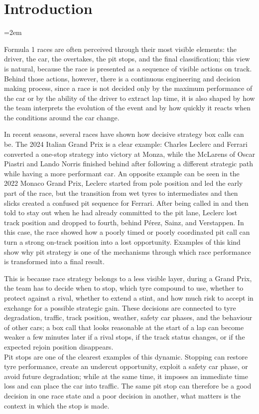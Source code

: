 \chapter{Introduction}
\label{ch:introduction}
\emergencystretch=2em

Formula 1 races are often perceived through their most visible elements: the driver, the car, the overtakes, the pit stops, and the final classification; this view is natural,
because the race is presented as a sequence of visible actions on track. Behind those actions, however, there is a continuous engineering and decision making process, since
a race is not decided only by the maximum performance of the car or by the ability of the driver to extract lap time, it is also shaped by how the team interprets the
evolution of the event and by how quickly it reacts when the conditions around the car change.

In recent seasons, several races have shown how decisive strategy box calls can be. The 2024 Italian Grand Prix is a clear example: Charles Leclerc and Ferrari converted a 
one-stop strategy into victory at Monza, while the McLarens of Oscar Piastri and Lando Norris finished behind after following a different strategic path while having a more performant car.
An opposite example can be seen in the 2022 Monaco Grand Prix, Leclerc started from pole position and led the early part of the race, but the transition 
from wet tyres to intermediates and then slicks created a confused pit sequence for Ferrari. After being called in and then told to stay out when he had 
already committed to the pit lane, Leclerc lost track position and dropped to fourth, behind Pérez, Sainz, and Verstappen. In this case, the race showed how a 
poorly timed or poorly coordinated pit call can turn a strong on-track position into a lost opportunity.
Examples of this kind show why pit strategy is one of the mechanisms through which race performance is transformed into a final result.

This is because race strategy belongs to a less visible layer, during a Grand Prix, the team has to decide when to stop, which tyre compound to use, whether to protect against a
rival, whether to extend a stint, and how much risk to accept in exchange for a possible strategic gain. These decisions are connected to tyre
degradation, traffic, track position, weather, safety car phases, and the behaviour of other cars; a box call that looks reasonable at the start of a lap can become
weaker a few minutes later if a rival stops, if the track status changes, or if the expected rejoin position disappears.\\
Pit stops are one of the clearest examples of this dynamic. Stopping can restore tyre performance, create an undercut opportunity, exploit a safety car phase, or avoid
future degradation; while at the same time, it imposes an immediate time loss and can place the car into traffic. The same pit stop can therefore be a good decision in one
race state and a poor decision in another, what matters is the context in which the stop is made.

